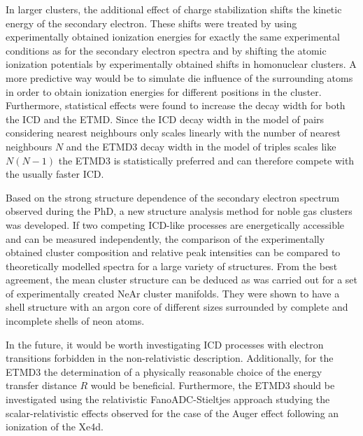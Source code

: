 In larger clusters, the additional effect of charge stabilization
shifts the kinetic energy of the secondary
electron. These shifts were treated by using experimentally obtained
ionization energies for exactly the same experimental conditions as for the
secondary electron spectra and by shifting the atomic ionization potentials
by experimentally obtained shifts in homonuclear clusters.
A more predictive way would be to simulate die influence of the surrounding
atoms in order to obtain ionization energies for different positions in
the cluster.
Furthermore, statistical effects were found to increase the decay width
for both the ICD and the ETMD. Since the ICD decay width in the model of pairs
considering nearest neighbours only scales linearly with the number
of nearest neighbours $N$ and the ETMD3 decay width in the model of triples
scales like $N(N-1)$
the ETMD3 is statistically preferred and can therefore compete
with the usually faster ICD.

Based on the strong structure dependence of the secondary electron spectrum
observed during the PhD, a new
structure analysis method for noble gas clusters was developed. If two
competing ICD-like processes are energetically accessible and can be measured
independently, the comparison of the experimentally obtained cluster
composition and relative peak intensities can be compared to theoretically
modelled spectra for a large variety of structures. From the best agreement,
the mean cluster structure can be deduced as was carried out for
a set of experimentally created NeAr cluster manifolds. They were shown
to have a shell structure with an argon core of different sizes surrounded
by complete and incomplete shells of neon atoms.

In the future, it would be worth investigating \ac{ICD} processes with electron
transitions forbidden in the non-relativistic description.
Additionally, for the ETMD3 the determination of a physically reasonable
choice of the energy transfer distance $R$ would be beneficial.
Furthermore, the ETMD3 should be investigated using the relativistic
FanoADC-Stieltjes approach studying the scalar-relativistic effects observed
for the case of the Auger effect following an ionization of the Xe4d.

